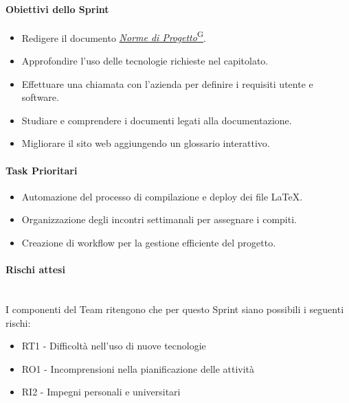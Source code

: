 \documentclass{article}
\begin{document}
                \paragraph{Obiettivi dello Sprint}
                    \begin{itemize}
                        \item Redigere il documento \href{https://code7crusaders.github.io/docs/RTB/documentazione_interna/glossario.html#norme-di-progetto}{\emph{Norme di Progetto}\textsuperscript{G}}.
                        \item Approfondire l'uso delle tecnologie richieste nel capitolato.
                        \item Effettuare una chiamata con l'azienda per definire i requisiti utente e software.
                        \item Studiare e comprendere i documenti legati alla documentazione.
                        \item Migliorare il sito web aggiungendo un glossario interattivo.
                    \end{itemize}

                \paragraph{Task Prioritari}
                    \begin{itemize}
                        \item Automazione del processo di compilazione e deploy dei file LaTeX.
                        \item Organizzazione degli incontri settimanali per assegnare i compiti.
                        \item Creazione di workflow per la gestione efficiente del progetto.
                    \end{itemize}

                \paragraph{Rischi attesi}\mbox{}\\
                I componenti del Team ritengono che per questo Sprint siano possibili i seguenti rischi:
                \begin{itemize}
                    \item RT1 - Difficoltà nell’uso di nuove tecnologie
                    \item RO1 - Incomprensioni nella pianificazione delle attività
                    \item RI2 - Impegni personali e universitari
                \end{itemize}
\end{document}

